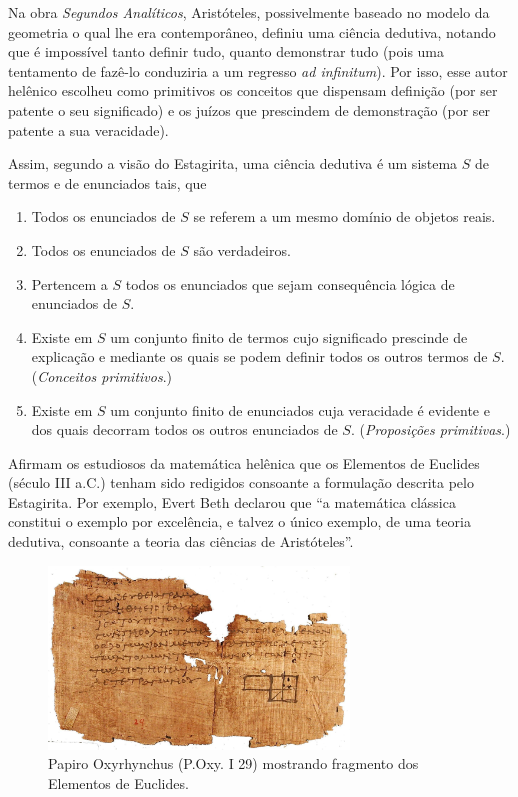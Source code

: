 \documentclass{hipatia}
\begin{document}
Na obra \emph{Segundos Analíticos}, Aristóteles, possivelmente baseado no modelo da geometria o qual lhe era contemporâneo, definiu uma ciência dedutiva, notando que é impossível tanto definir tudo, quanto demonstrar tudo  (pois uma tentamento de fazê-lo conduziria a um regresso \emph{ad infinitum}). Por isso, esse autor helênico escolheu como primitivos os conceitos que dispensam definição  (por ser patente o seu significado)  e os juízos que prescindem de demonstração  (por ser patente a sua veracidade). 

Assim, segundo a visão do Estagirita, uma ciência dedutiva é um sistema $S$ de termos e de enunciados tais, que
\begin{enumerate}
    \item Todos os enunciados de $S$ se referem a um mesmo domínio de objetos reais.
    \item Todos os enunciados de $S$ são verdadeiros.   
      
\item Pertencem a $S$ todos os enunciados que sejam consequência lógica de enunciados de $S$.
\item Existe em $S$ um conjunto finito de termos cujo significado prescinde de explicação e mediante os quais se podem definir todos os outros termos de $S$. (\emph{Conceitos primitivos}.) 
\item Existe em $S$ um conjunto finito de enunciados cuja veracidade é evidente e dos quais decorram todos os outros enunciados de $S$.  (\emph{Proposições primitivas}.)   \cite{costa1994}
\end{enumerate}

Afirmam os estudiosos da matemática helênica que os Elementos de Euclides  (século III a.C.)  tenham sido redigidos consoante a formulação descrita pelo Estagirita. Por exemplo, Evert Beth declarou que ``a matemática clássica constitui o exemplo por excelência, e talvez o único exemplo, de uma teoria dedutiva, consoante a teoria das ciências de Aristóteles''. \cite{beth1955}

\begin{figure}[htb!]
    \includegraphics[width=8cm]{Oxy.jpg}
 \caption*{Papiro Oxyrhynchus (P.Oxy. I 29) mostrando fragmento dos Elementos de Euclides.}   
\end{figure}
\end{document}
